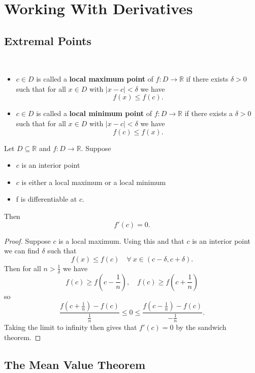 \section{Working With Derivatives}

\subsection{Extremal Points}

\begin{definition} $ $
  \begin{itemize}
    \item $c \in D$ is called a {\bf local maximum point} of $f : D \rightarrow \mathbb{R}$ if there exists $\delta > 0$ such that for all $x \in D$ with $|x - c| < \delta$ we have
    \[f(x) \leq f(c).\]
\item $c \in D$ is called a {\bf local minimum point} of $f : D \rightarrow \mathbb{R}$ if there exists a $\delta > 0$ such that for all $x \in D$ with $|x - c| < \delta$ we have
    \[f(c) \leq f(x).\]
  \end{itemize}
\end{definition}

\begin{theorem}
    Let $D \subseteq \mathbb{R}$ and $f : D \rightarrow \mathbb{R}$. Suppose 
    \begin{itemize}
      \item $c$ is an interior point
      \item $c$ is either a local maximum or a local minimum
      \item f is differentiable at $c$.
    \end{itemize}
    Then \[f'(c) = 0.\]
\end{theorem}
\begin{proof}
    Suppose $c$ is a local maximum. Using this and that $c$ is an interior point we can find $\delta$ such that
    \[f(x) \leq f(c) \quad \forall \ x \in (c - \delta, c + \delta).\]
    Then for all $n > \frac{1}{\delta}$ we have
    \[f(c) \geq f(c - \frac{1}{n}), \quad f(c) \geq f(c + \frac{1}{n})\]
    so
    \[ \frac{f(c + \frac{1}{n}) - f(c)}{\frac{1}{n}} \leq 0 \leq \frac{f(c - \frac{1}{n}) - f(c)}{- \frac{1}{n}}.\]
    Taking the limit to infinity then gives that $f'(c)= 0$ by the sandwich theorem.
\end{proof}

\subsection{The Mean Value Theorem}

